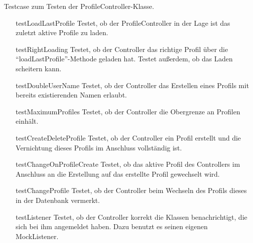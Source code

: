 \documentclass[parskip=full]{scrreprt}
\begin{document}
Testcase zum Testen der ProfileController-Klasse.

\begin{itemize}
	\item[testLoadLastProfile] Testet, ob der ProfileController in der Lage ist das zuletzt aktive Profile zu laden.
	\item[testRightLoading] Testet, ob der Controller das richtige Profil über die \enquote{loadLastProfile}-Methode geladen hat. Testet außerdem, ob das Laden scheitern kann.
	\item[testDoubleUserName] Testet, ob der Controller das Erstellen eines Profils mit bereits existierenden Namen erlaubt.
	\item[testMaximumProfiles] Testet, ob der Controller die Obergrenze an Profilen einhält.
	\item[testCreateDeleteProfile] Testet, ob der Controller ein Profil erstellt und die Vernichtung dieses Profils im Anschluss vollständig ist.
	\item[testChangeOnProfileCreate] Testet, ob das aktive Profil des Controllers im Anschluss an die Erstellung auf das erstellte Profil gewechselt wird.
	\item[testChangeProfile] Testet, ob der Controller beim Wechseln des Profils dieses in der Datenbank vermerkt.
	\item[testListener] Testet, ob der Controller korrekt die Klassen benachrichtigt, die sich bei ihm angemeldet haben. Dazu benutzt es seinen eigenen MockListener.
\end{itemize}
\end{document}
